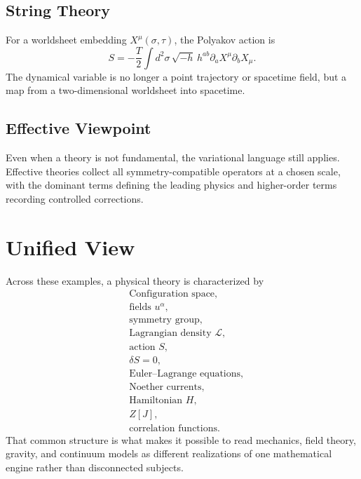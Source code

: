 \documentclass[11pt]{article}
\newcommand{\Lag}{\mathcal{L}}
\begin{document}
\subsection{String Theory}
For a worldsheet embedding $X^\mu(\sigma,\tau)$, the Polyakov action is
\[
\boxed{
S=
-\frac{T}{2}\int d^2\sigma\,
\sqrt{-h}\,h^{ab}\partial_aX^\mu\partial_bX_\mu.
}
\]
The dynamical variable is no longer a point trajectory or spacetime field, but
a map from a two-dimensional worldsheet into spacetime.

\subsection{Effective Viewpoint}
Even when a theory is not fundamental, the variational language still applies.
Effective theories collect all symmetry-compatible operators at a chosen scale,
with the dominant terms defining the leading physics and higher-order terms
recording controlled corrections.

\section{Unified View}
Across these examples, a physical theory is characterized by
\[
\boxed{
\begin{aligned}
&\text{Configuration space}, \\
&\text{fields } u^\alpha, \\
&\text{symmetry group}, \\
&\text{Lagrangian density } \Lag, \\
&\text{action } S, \\
&\delta S=0, \\
&\text{Euler--Lagrange equations}, \\
&\text{Noether currents}, \\
&\text{Hamiltonian } H, \\
&Z[J], \\
&\text{correlation functions.}
\end{aligned}
}
\]
That common structure is what makes it possible to read mechanics, field
theory, gravity, and continuum models as different realizations of one
mathematical engine rather than disconnected subjects.
\end{document}
